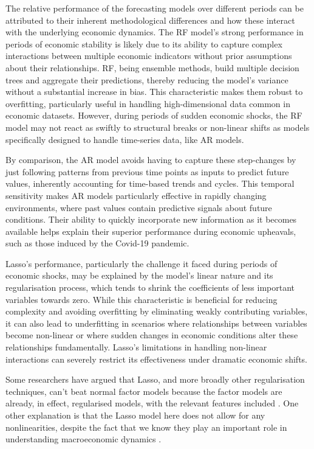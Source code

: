 The relative performance of the forecasting models over different periods can be attributed to their inherent methodological differences and how these interact with the underlying economic dynamics. The RF model's strong performance in periods of economic stability is likely due to its ability to capture complex interactions between multiple economic indicators without prior assumptions about their relationships. RF, being ensemble methods, build multiple decision trees and aggregate their predictions, thereby reducing the model's variance without a substantial increase in bias. This characteristic makes them robust to overfitting, particularly useful in handling high-dimensional data common in economic datasets. However, during periods of sudden economic shocks, the RF model may not react as swiftly to structural breaks or non-linear shifts as models specifically designed to handle time-series data, like AR models.

By comparison, the AR model avoids having to capture these step-changes by just following patterns from previous time points as inputs to predict future values, inherently accounting for time-based trends and cycles. This temporal sensitivity makes AR models particularly effective in rapidly changing environments, where past values contain predictive signals about future conditions. Their ability to quickly incorporate new information as it becomes available helps explain their superior performance during economic upheavals, such as those induced by the Covid-19 pandemic.

Lasso’s performance, particularly the challenge it faced during periods of economic shocks, may be explained by the model's linear nature and its regularisation process, which tends to shrink the coefficients of less important variables towards zero. While this characteristic is beneficial for reducing complexity and avoiding overfitting by eliminating weakly contributing variables, it can also lead to underfitting in scenarios where relationships between variables become non-linear or where sudden changes in economic conditions alter these relationships fundamentally. Lasso's limitations in handling non-linear interactions can severely restrict its effectiveness under dramatic economic shifts.

Some researchers have argued that Lasso, and more broadly other regularisation techniques, can't beat normal factor models because the factor models are already, in effect, regularised models, with the relevant features included \autocite{GouletCoulombe2022HowForecasting}. One other explanation is that the Lasso model here does not allow for any nonlinearities, despite the fact that we know they play an important role in understanding macroeconomic dynamics \autocite{Forbes2022LowWorld}.

